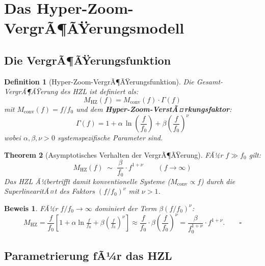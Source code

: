 ﻿\documentclass[12pt,a4paper]{article}
\newtheorem{theorem}{Theorem}[section]
\newtheorem{definition}[theorem]{Definition}
\newtheorem{beweis}{Beweis}
\theoremstyle{definition}
\newcommand{\HZ}{\mathrm{HZ}}
\newcommand{\conv}{\mathrm{conv}}
\begin{document}
	\section{Das Hyper-Zoom-VergrÃ¶ÃŸerungsmodell}
	
	\subsection{Die VergrÃ¶ÃŸerungsfunktion}
	
	\begin{definition}[Hyper-Zoom-VergrÃ¶ÃŸerungsfunktion]
		Die Gesamt-VergrÃ¶ÃŸerung des HZL ist definiert als:
		\begin{equation}
			\boxed{
				M_\HZ(f) = M_\conv(f)\cdot\Gamma(f)
			}
			\label{eq:mhz}
		\end{equation}
		mit $M_\conv(f) = f/f_0$ und dem \textbf{Hyper-Zoom-VerstÃ¤rkungsfaktor}:
		\begin{equation}
			\Gamma(f) = 1 + \alpha\,\ln\!\left(\frac{f}{f_0}\right)
			+ \beta\!\left(\frac{f}{f_0}\right)^{\!\nu}
			\label{eq:gamma}
		\end{equation}
		wobei $\alpha, \beta, \nu > 0$ systemspezifische Parameter sind.
	\end{definition}
	
	\begin{theorem}[Asymptotisches Verhalten der VergrÃ¶ÃŸerung]
		FÃ¼r $f \gg f_0$ gilt:
		\begin{equation}
			M_\HZ(f) \;\sim\; \frac{\beta}{f_0}\cdot f^{1+\nu}
			\qquad (f \to \infty)
		\end{equation}
		Das HZL Ã¼bertrifft damit konventionelle Systeme ($M_\conv \propto f$) durch die
		SuperlinearitÃ¤t des Faktors $(f/f_0)^\nu$ mit $\nu > 1$.
	\end{theorem}
	
	\begin{beweis}
		FÃ¼r $f/f_0 \to \infty$ dominiert der Term $\beta(f/f_0)^\nu$:
		\[
		M_\HZ = \frac{f}{f_0}\!\left[1 + \alpha\ln\!\tfrac{f}{f_0}
		+ \beta\!\left(\tfrac{f}{f_0}\right)^{\!\nu}\right]
		\approx \frac{f}{f_0}\cdot\beta\!\left(\frac{f}{f_0}\right)^{\!\nu}
		= \frac{\beta}{f_0^{1+\nu}}\cdot f^{1+\nu}. \qquad\square
		\]
	\end{beweis}
	
	\subsection{Parametrierung fÃ¼r das HZL}
	
\end{document}
